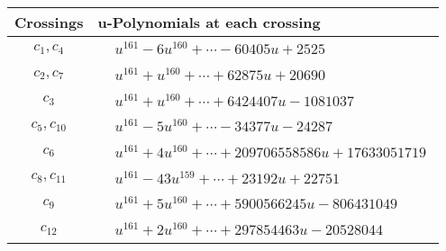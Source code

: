 \documentclass[1p]{elsarticle_modified}
\theoremstyle{definition}
\begin{document}
\begin{tabular}{m{50pt}|m{274pt}}
Crossings & \hspace{64pt}u-Polynomials at each crossing \\
\hline $$\begin{aligned}c_{1},c_{4}\end{aligned}$$&$\begin{aligned}
&u^{161}-6 u^{160}+\cdots-60405 u+2525
\end{aligned}$\\
\hline $$\begin{aligned}c_{2},c_{7}\end{aligned}$$&$\begin{aligned}
&u^{161}+u^{160}+\cdots+62875 u+20690
\end{aligned}$\\
\hline $$\begin{aligned}c_{3}\end{aligned}$$&$\begin{aligned}
&u^{161}+u^{160}+\cdots+6424407 u-1081037
\end{aligned}$\\
\hline $$\begin{aligned}c_{5},c_{10}\end{aligned}$$&$\begin{aligned}
&u^{161}-5 u^{160}+\cdots-34377 u-24287
\end{aligned}$\\
\hline $$\begin{aligned}c_{6}\end{aligned}$$&$\begin{aligned}
&u^{161}+4 u^{160}+\cdots+209706558586 u+17633051719
\end{aligned}$\\
\hline $$\begin{aligned}c_{8},c_{11}\end{aligned}$$&$\begin{aligned}
&u^{161}-43 u^{159}+\cdots+23192 u+22751
\end{aligned}$\\
\hline $$\begin{aligned}c_{9}\end{aligned}$$&$\begin{aligned}
&u^{161}+5 u^{160}+\cdots+5900566245 u-806431049
\end{aligned}$\\
\hline $$\begin{aligned}c_{12}\end{aligned}$$&$\begin{aligned}
&u^{161}+2 u^{160}+\cdots+297854463 u-20528044
\end{aligned}$\\
\hline
\end{tabular}\\~\\
\end{document}
